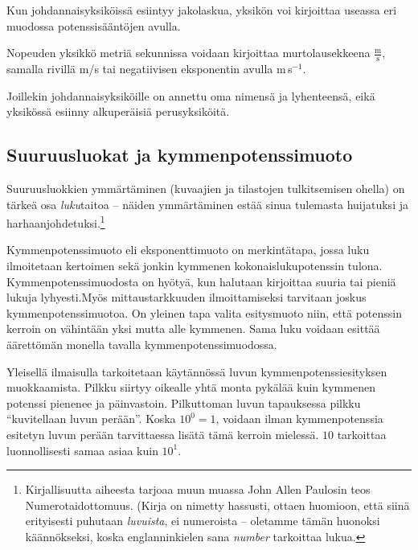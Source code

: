 Kun johdannaisyksiköissä esiintyy jakolaskua, yksikön voi kirjoittaa useassa eri muodossa potenssisääntöjen avulla.

\begin{esimerkki}
Nopeuden yksikkö metriä sekunnissa voidaan kirjoittaa murtolausekkeena $\frac{\text{m}}{\text{s}}$, samalla rivillä m/s tai negatiivisen eksponentin avulla m\,s$^{-1}$.
\end{esimerkki}

Joillekin johdannaisyksiköille on annettu oma nimensä ja lyhenteensä, eikä yksikössä esiinny alkuperäisiä perusyksiköitä. 

\begin{esimerkki}
\end{esimerkki}

\subsection*{Suuruusluokat ja kymmenpotenssimuoto}

Suuruusluokkien ymmärtäminen (kuvaajien ja tilastojen tulkitsemisen ohella) on tärkeä osa \textit{luku}taitoa -- näiden ymmärtäminen estää sinua tulemasta huijatuksi ja harhaanjohdetuksi.\footnote[1]{Kirjallisuutta aiheesta tarjoaa muun muassa John Allen Paulosin teos Numerotaidottomuus. (Kirja on nimetty hassusti, ottaen huomioon, että siinä erityisesti puhutaan \textit{luvuista}, ei numeroista -- oletamme tämän huonoksi käännökseksi, koska englanninkielen sana \textit{number} tarkoittaa lukua.}

Kymmenpotenssimuoto eli eksponenttimuoto on merkintätapa, jossa luku ilmoitetaan kertoimen sekä jonkin kymmenen kokonaislukupotenssin tulona. Kymmenpotenssimuodosta on hyötyä, kun halutaan kirjoittaa suuria tai pieniä lukuja lyhyesti.Myös mittaustarkkuuden ilmoittamiseksi tarvitaan joskus kymmenpotenssimuotoa. On yleinen tapa valita esitysmuoto niin, että potenssin kerroin on vähintään yksi mutta alle kymmenen. Sama luku voidaan esittää äärettömän monella tavalla kymmenpotenssimuodossa.

Yleisellä ilmaisulla  tarkoitetaan käytännössä luvun kymmenpotenssiesityksen muokkaamista. Pilkku siirtyy oikealle yhtä monta pykälää kuin kymmenen potenssi pienenee ja päinvastoin. Pilkuttoman luvun tapauksessa pilkku ``kuvitellaan luvun perään''. Koska $10^0 = 1$, voidaan ilman kymmenpotenssia esitetyn luvun perään tarvittaessa lisätä tämä kerroin mielessä. $10$ tarkoittaa luonnollisesti samaa asiaa kuin $10^1$. 

